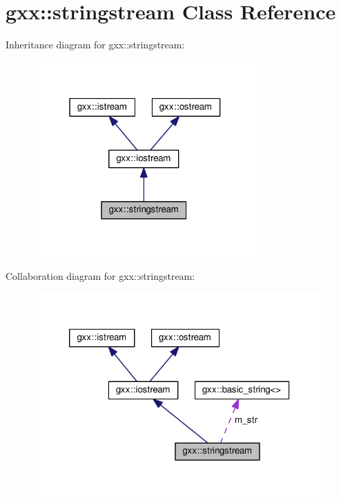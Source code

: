 \hypertarget{classgxx_1_1stringstream}{}\section{gxx\+:\+:stringstream Class Reference}
\label{classgxx_1_1stringstream}


Inheritance diagram for gxx\+:\+:stringstream\+:
\nopagebreak
\begin{figure}[H]
\begin{center}
\leavevmode
\includegraphics[width=244pt]{classgxx_1_1stringstream__inherit__graph}
\end{center}
\end{figure}


Collaboration diagram for gxx\+:\+:stringstream\+:
\nopagebreak
\begin{figure}[H]
\begin{center}
\leavevmode
\includegraphics[width=320pt]{classgxx_1_1stringstream__coll__graph}
\end{center}
\end{figure}
